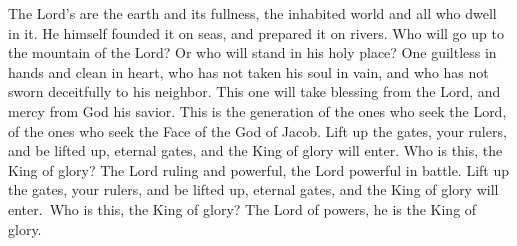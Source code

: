 The Lord's are the earth and its fullness, the inhabited world and all who dwell in it. He himself founded it on seas, and prepared it on rivers. Who will go up to the mountain of the Lord? Or who will stand in his holy place? One guiltless in hands and clean in heart, who has not taken his soul in vain, and who has not sworn deceitfully to his neighbor. This one will take blessing from the Lord, and mercy from God his savior. This is the generation of the ones who seek the Lord, of the ones who seek the Face of the God of Jacob. Lift up the gates, your rulers, and be lifted up, eternal gates, and the King of glory will enter. Who is this, the King of glory? The Lord ruling and powerful, the Lord powerful in battle. Lift up the gates, your rulers, and be lifted up, eternal gates, and the King of glory will enter. Who is this, the King of glory? The Lord of powers, he is the King of glory.